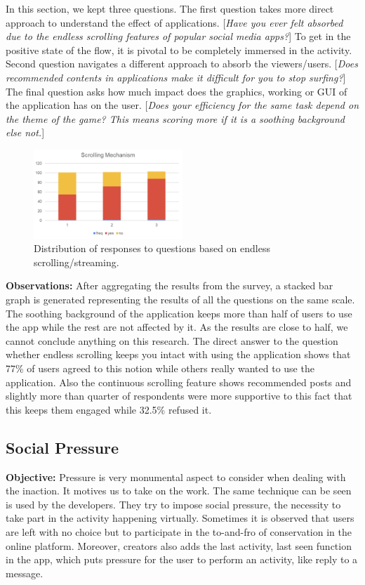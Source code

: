 \documentclass[conference]{IEEEtran}
\begin{document}
In this section, we kept three questions. The first question takes more direct approach to understand the effect of applications. [\textit{Have you ever felt absorbed due to the endless scrolling features of popular social media apps?}] To get in the positive state of the flow, it is pivotal to be completely immersed in the activity. Second question navigates a different approach to absorb the viewers/users. [\textit{Does recommended contents in applications make it difficult for you to stop surfing?}] The final question asks how much impact does the graphics, working or GUI of the application has on the user. [\textit{Does your efficiency for the same task depend on the theme of the game? This means scoring more if it is a soothing background else not.}]


\begin{figure}[htbp]
\centerline{\includegraphics[width=0.5\textwidth]{Endless Scrolling.png}}
\caption{Distribution of responses to questions based on endless scrolling/streaming.}
\label{sr}
\end{figure}

\textbf{Observations: }After aggregating the results from the survey, a stacked bar graph is generated representing the results of all the questions on the same scale. The soothing background of the application keeps more than half of users to use the app while the rest are not affected by it. As the results are close to half, we cannot conclude anything on this research. The direct answer to the question whether endless scrolling keeps you intact with using the application shows that 77\% of users agreed to this notion while others really wanted to use the application. Also the continuous scrolling feature shows recommended posts and slightly more than quarter of respondents were more supportive to this fact  that this keeps them engaged while 32.5\% refused it.

\subsection{Social Pressure}
\textbf{Objective:} Pressure is very monumental aspect to consider when dealing with the inaction. It motives us to take on the work. The same technique can be seen is used by the developers. They try to impose social pressure, the necessity to take part in the activity happening virtually. Sometimes it is observed that users are left with no choice but to participate in the to-and-fro of conservation in the online platform. Moreover, creators also adds the last activity, last seen function in the app, which puts pressure for the user to perform an activity, like reply to a message. 
\end{document}

